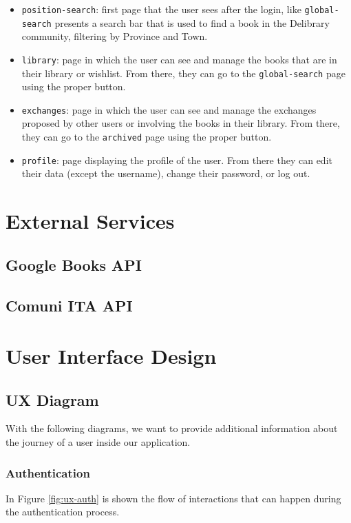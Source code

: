 \begin{itemize}
    \item \texttt{position-search}:
          first page that the user sees after the login, like \texttt{global-search} presents a search bar that is used to find a book
          in the Delibrary community, filtering by Province and Town.
    \item \texttt{library}:
          page in which the user can see and manage the books that are in their library or wishlist.
          From there, they can go to the \texttt{global-search} page using the proper button.
    \item \texttt{exchanges}:
          page in which the user can see and manage the exchanges proposed by other users or involving the books in their library.
          From there, they can go to the \texttt{archived} page using the proper button.
    \item \texttt{profile}:
          page displaying the profile of the user. From there they can edit their data (except the username), change their password, or log out.
\end{itemize}

\chapter{External Services}

\section{Google Books API}

\section{Comuni ITA API}



\chapter{User Interface Design}

\section{UX Diagram}
With the following diagrams, we want to provide additional information about the journey of a user inside our application.

\subsection{Authentication}
In Figure \ref{fig:ux-auth} is shown the flow of interactions that can happen during the authentication process.

